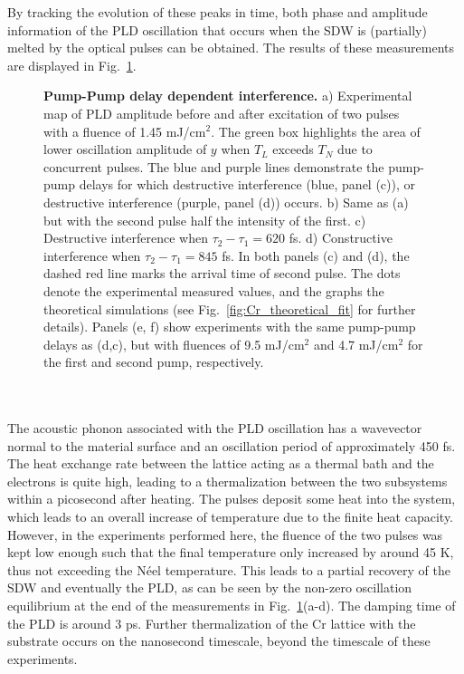 By tracking the evolution of these peaks in time, both phase and amplitude information of the PLD oscillation that occurs when the SDW is (partially) melted by the optical pulses can be obtained.
The results of these measurements are displayed in Fig.~\ref{fig:Cr_experimental}.
\begin{figure}
	\centering
{}
\caption{\label{fig:Cr_experimental}{\bf Pump-Pump delay dependent interference.} a) Experimental map of PLD amplitude before and after excitation of two pulses with a fluence of 1.45 mJ/cm$^2$. The green box highlights the area of lower oscillation amplitude of $y$ when $T_L$ exceeds $T_N$ due to concurrent pulses. The blue and purple lines demonstrate the pump-pump delays for which destructive interference (blue, panel (c)), or destructive interference (purple, panel (d)) occurs. b) Same as (a) but with the second pulse half the intensity of the first.  c) Destructive interference when $\tau_2 - \tau_1 = 620$ fs. d) Constructive interference when $\tau_2 - \tau_1 = 845$ fs. In both panels (c) and (d), the dashed red line marks the arrival time of second pulse. The dots denote the experimental measured values, and the graphs the theoretical simulations (see Fig.~\ref{fig:Cr_theoretical_fit} for further details). Panels (e, f) show experiments with the same pump-pump delays as (d,c), but with fluences of 9.5 mJ/cm$^2$ and 4.7 mJ/cm$^2$ for the first and second pump, respectively.}
\end{figure}
\\\\
The acoustic phonon associated with the PLD oscillation has a wavevector normal to the material surface and an oscillation period of approximately 450 fs.
The heat exchange rate between the lattice acting as a thermal bath and the electrons is quite high, leading to a thermalization between the two subsystems within a picosecond after heating.
The pulses deposit some heat into the system, which leads to an overall increase of temperature due to the finite heat capacity.
However, in the experiments performed here, the fluence of the two pulses was kept low enough such that the final temperature only increased by around 45 K, thus not exceeding the N\'eel temperature.
This leads to a partial recovery of the SDW and eventually the PLD, as can be seen by the non-zero oscillation equilibrium at the end of the measurements in Fig.~\ref{fig:Cr_experimental}(a-d).
The damping time of the PLD is around 3 ps.
Further thermalization of the Cr lattice with the substrate occurs on the nanosecond timescale, beyond the timescale of these experiments.
